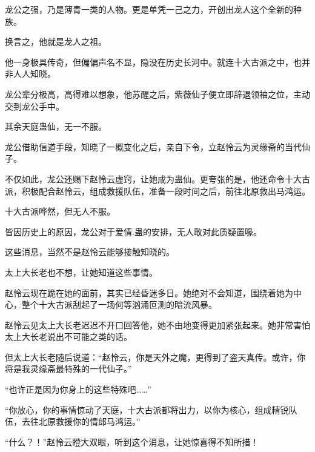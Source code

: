 \begin{this_body}
龙公之强，乃是薄青一类的人物。更是单凭一己之力，开创出龙人这个全新的种族。

换言之，他就是龙人之祖。

他一身极具传奇，但偏偏声名不显，隐没在历史长河中。就连十大古派之中，也并非人人知晓。

龙公辈分极高，高得难以想象，他苏醒之后，紫薇仙子便立即辞退领袖之位，主动交到龙公手中。

其余天庭蛊仙，无一不服。

龙公借助信道手段，知晓了一概变化之后，亲自下令，立赵怜云为灵缘斋的当代仙子。

不仅如此，龙公还赐下赵怜云虚窍，让她成为蛊仙。更夸张的是，他还命令十大古派，积极配合赵怜云，组成救援队伍，准备一段时间之后，前往北原救出马鸿运。

十大古派哗然，但无人不服。

皆因历史上的原因，龙公对于爱情.蛊的安排，无人敢对此质疑置喙。

这些消息，当然不是赵怜云能够接触知晓的。

太上大长老也不想，让她知道这些事情。

赵怜云现在跪在她的面前，其实已经昏迷多日。她绝对不会知道，围绕着她为中心，整个十大古派刮起了一场何等汹涌叵测的暗流风暴。

赵怜云见太上大长老迟迟不开口回答他，她不由地变得更加紧张起来。她非常害怕太上大长老说出不可能之类的话。

但太上大长老随后说道：“赵怜云，你是天外之魔，更得到了盗天真传。或许，你将是我灵缘斋最特殊的一代仙子。”

“也许正是因为你身上的这些特殊吧……”

“你放心，你的事情惊动了天庭，十大古派都将出力，以你为核心，组成精锐队伍，去往北原救援你的情郎马鸿运。”

“什么？！”赵怜云瞪大双眼，听到这个消息，让她惊喜得不知所措！

\end{this_body}

